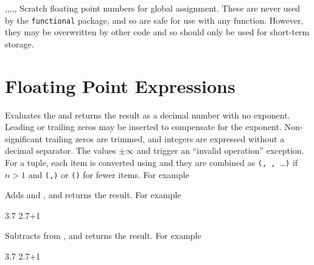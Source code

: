 \documentclass[oneside]{book}
\begin{document}
\begin{variable}{\gTmpaFp,\gTmpbFp,\gTmpcFp,\gTmpiFp,\gTmpjFp,\gTmpkFp}
Scratch floating point numbers for global assignment. These are never used by
the \verb!functional! package, and so are safe for use with any
function. However, they may be overwritten by other
code and so should only be used for short-term storage.
\end{variable}

\section{Floating Point Expressions}

\begin{function}{\FpEval}
\begin{syntax}
 
\end{syntax}
Evaluates the  and returns the
result as a decimal number with no
exponent.  Leading or trailing zeros may be inserted to compensate
for the exponent.  Non-significant trailing zeros are trimmed, and
integers are expressed without a decimal separator.  The values
$\pm\infty$ and \nan{} trigger an \enquote{invalid operation}
exception.
For a tuple, each item is converted using  and they are combined as
\verb|(|\verb*|, |\verb*|, |\ldots{}\verb|)|
if $n>1$ and \verb|(|\verb|,)| or \verb|()| for fewer items.
For example
\begin{demohigh}
\end{demohigh}
\end{function}

\begin{function}{\FpMathAdd}
\begin{syntax}
  
\end{syntax}
Adds  and ,
and returns the result. For example
\begin{demohigh}
 {3.7}
 {2.7+1}
\end{demohigh}
\end{function}

\begin{function}{\FpMathSub}
\begin{syntax}
  
\end{syntax}
Subtracts  from ,
and returns the result. For example
\begin{demohigh}
 {3.7}
 {2.7+1}
\end{demohigh}
\end{function}
\end{document}
